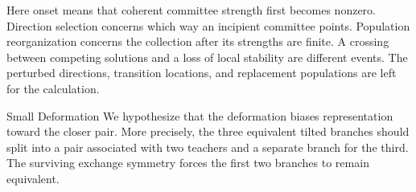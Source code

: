 \documentclass[11pt, reqno]{amsart}
\makeatletter
\def\section{\@startsection{section}{1}%
  \z@{.7\linespacing\@plus\linespacing}{.5\linespacing}%
  {\normalfont\scshape\centering}}
\theoremstyle{notestyle}
\theoremstyle{defstyle}
\makeatother
\begin{document}
Here onset means that coherent committee strength first becomes
nonzero. Direction selection concerns which way an incipient committee
points. Population reorganization concerns the collection after its
strengths are finite. A crossing between competing solutions and a
loss of local stability are different events. The perturbed
directions, transition locations, and replacement populations are
left for the calculation.


\section{Small Deformation}
We hypothesize that the deformation biases representation toward the closer pair. More precisely, the three equivalent tilted branches should split into a pair associated with two teachers and a separate branch for the third. The surviving exchange symmetry forces the first two branches to remain equivalent.
\end{document}
